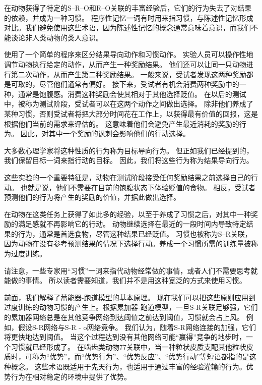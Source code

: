 在动物获得了特定的S–R–O和R–O关联的丰富经验后，它们的行为失去了对结果的依赖，并成为一种习惯。
程序性记忆一词有时用来指习惯，与陈述性记忆形成对比。我们避免使用这些术语，因为陈述性记忆的概念通常意味着意识，而我们不能谈论非人类动物的类人意识。\par


\cite{balleine2003effect}使用了一个简单的程序来区分结果导向动作和习惯动作。
实验人员可以操作性地调节动物执行给定的动作，从而产生一种奖励结果。
他们还可以让同一只动物进行第二次动作，从而产生第二种奖励结果。
一般来说，受试者发现这两种奖励都是可取的，尽管他们通常有偏好。
接下来，受试者有机会消费两种奖励中的一种，通常是饱腹感。消费这种奖励会使其相对于其他选择贬值。
在以后的测试中，被称为测试阶段，受试者可以在这两个动作之间做出选择。
除非他们养成了某种习惯，否则受试者将把大部分时间花在工作上，以获得最有价值的回报，这是根据他们当前的需求来评估的。
这意味着他们会避免产生最近消耗的奖励的行为。
因此，对其中一个奖励的讽刺会影响他们的行动选择。\par


大多数心理学家将这种性质的行为称为目标导向行为。
但正如我们已经提到的，我们保留目标一词来指行动的目标。
因此，我们将这些行为称为结果导向行为。\par


这些实验的一个重要特征是，动物在测试阶段接受任何奖励结果之前选择自己的行动。
也就是说，他们不需要在目前的饱腹状态下体验贬值的食物。
相反，受试者预测他们的行为将产生的奖励的价值，并据此做出选择。\par


在动物在这类任务上获得了如此多的经验，以至于养成了习惯之后，对其中一种奖励的满足感就不再影响它的行动。
动物继续选择在最近的一段时间内导致特定结果的行为，通常是首选食物，尽管这种结果已经贬值。
习惯也被称为S–R关联，因为动物在没有参考预测结果的情况下选择行动。养成一个习惯所需的训练量被称为过度训练。\par


请注意，一些专家用“习惯”一词来指代动物经常做的事情，或者人们不需要思考就能做的事情。
所以读者需要知道，我们并不是用这种宽泛的方式来使用习惯。\par


前面，我们解释了蓄能器-跑道模型的基本原理。
现在我们可以把这些原则应用到过度训练的动物习惯的产生上。根据累加器-跑道模型，一旦S-R关联足够强，它们的累加器网络总是在其他竞争网络到达阈值之前达到阈值，习惯就会占上风。
例如，假设S-R网络与S-R - o网络竞争。
我们认为，随着S-R网络连接的加强，它们将更快地达到阈值。
当这个过程达到没有其他网络可能“赢得”竞争的地步时，一个习惯就已经形成了。
在啮齿类动物77关联中，当一种粒状皮质支配其他粒状皮质时，可称为“优势”，而“优势行为”、“优势反应”、“优势行动”等短语都指的是这种概念。
这些术语既适用于先天行为，也适用于通过丰富的经验灌输的行为。优势行为在相对稳定的环境中提供了优势。\par


